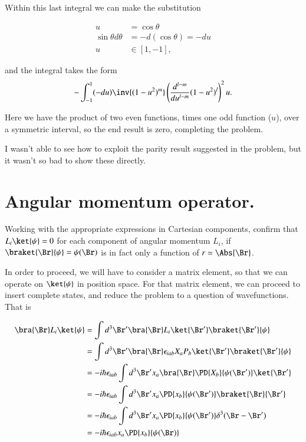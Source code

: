 Within this last integral we can make the substitution

\begin{align}\label{eqn:phy456ps1:820}
u &= \cos\theta \\
\sin\theta d\theta &= - d(\cos\theta) = -du \\
u &\in [1, -1],
\end{align}

and the integral takes the form
\begin{equation}\label{eqn:phy456ps1:840}
-\int_{-1}^1 
(-du) 
\inv{(1 - u^2)^m} 
\left( \frac{d^{l-m}}{d u^{l -m }} (1 - u^2)^l
\right)^2 u.
\end{equation}

Here we have the product of two even functions, times one odd function ($u$), over a symmetric interval, so the end result is zero, completing the problem.

I wasn't able to see how to exploit the parity result suggested in the problem, but it wasn't so bad to show these directly.

\section{Angular momentum operator.}

Working with the appropriate expressions in Cartesian components, confirm that $L_i \ket{\psi} = 0$ for each component of angular momentum $L_i$, if $\braket{\Br}{\psi} = \psi(\Br)$ is in fact only a function of $r = \Abs{\Br}$.

In order to proceed, we will have to consider a matrix element, so that we can operate on $\ket{\psi}$ in position space.  For that matrix element, we can proceed to insert complete states, and reduce the problem to a question of wavefunctions.  That is

\begin{align*}
\bra{\Br} L_i \ket{\psi}
&=
\int d^3 \Br' \bra{\Br} L_i \ket{\Br'} \braket{\Br'}{\psi} \\
&=
\int d^3 \Br' \bra{\Br} \epsilon_{i a b} X_a P_b \ket{\Br'} \braket{\Br'}{\psi} \\
&=
-i \hbar \epsilon_{i a b} \int d^3 \Br' x_a \bra{\Br} \PD{X_b}{\psi(\Br')} \ket{\Br'}  \\
&=
-i \hbar \epsilon_{i a b} \int d^3 \Br' x_a \PD{x_b}{\psi(\Br')} \braket{\Br}{\Br'}  \\
&=
-i \hbar \epsilon_{i a b} \int d^3 \Br' x_a \PD{x_b}{\psi(\Br')} \delta^3(\Br - \Br') \\
&=
-i \hbar \epsilon_{i a b} x_a \PD{x_b}{\psi(\Br)} 
\end{align*}

